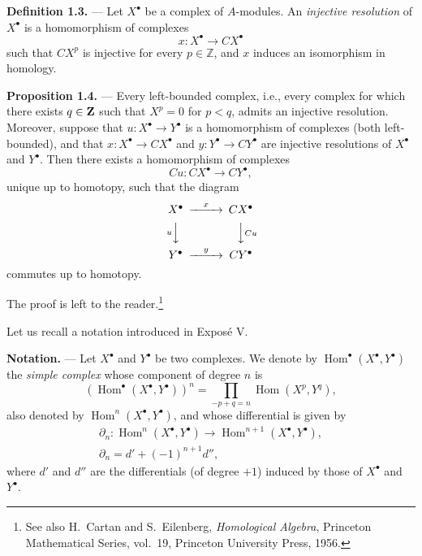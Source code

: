 \medskip
{}\noindent\textbf{Definition 1.3.} --- Let $X^\bullet$ be a complex of
$A$-modules. An \emph{injective resolution} of $X^\bullet$ is a homomorphism
of complexes
\[
  x\colon X^\bullet\longrightarrow CX^\bullet
\]
such that $CX^p$ is injective for every $p\in\mathbb Z$, and $x$ induces an
isomorphism in homology.


\noindent\textbf{Proposition 1.4.} --- Every left-bounded complex, i.e., every
complex for which there exists $q\in\mathbf Z$ such that $X^p=0$ for $p<q$, admits
an injective resolution. Moreover, suppose that
$u\colon X^\bullet\longrightarrow Y^\bullet$ is a homomorphism of complexes
(both left-bounded), and that
$x\colon X^\bullet\longrightarrow CX^\bullet$ and
$y\colon Y^\bullet\longrightarrow CY^\bullet$ are injective resolutions of
$X^\bullet$ and $Y^\bullet$. Then there exists a homomorphism of complexes
\[
  Cu\colon CX^\bullet\longrightarrow CY^\bullet,
\]
unique up to homotopy, such that the diagram
\[
\begin{CD}
X^\bullet @>{x}>> CX^\bullet \\
@V{u}VV @VV{Cu}V \\
Y^\bullet @>{y}>> CY^\bullet
\end{CD}
\]
commutes up to homotopy.


The proof is left to the reader.\footnote{See also H.~Cartan and
S.~Eilenberg, \emph{Homological Algebra}, Princeton Mathematical Series,
vol.~19, Princeton University Press, 1956.}

Let us recall a notation introduced in Expos\'e V.

\medskip
\noindent\textbf{Notation.} --- Let $X^\bullet$ and $Y^\bullet$ be two
complexes. We denote by $\operatorname{Hom}^\bullet(X^\bullet,Y^\bullet)$ the
\emph{simple complex} whose component of degree $n$ is
\[
  (\operatorname{Hom}^\bullet(X^\bullet,Y^\bullet))^n
  =\prod_{-p+q=n}\operatorname{Hom}(X^p,Y^q),
\]
also denoted by $\operatorname{Hom}^n(X^\bullet,Y^\bullet)$, and whose
differential is given by
\begin{gather*}
  \partial_n\colon
  \operatorname{Hom}^n(X^\bullet,Y^\bullet)
  \longrightarrow
  \operatorname{Hom}^{n+1}(X^\bullet,Y^\bullet),\\
  \partial_n=d'+(-1)^{n+1}d'',
\end{gather*}
where $d'$ and $d''$ are the differentials (of degree $+1$) induced by those
of $X^\bullet$ and $Y^\bullet$.


\renewcommand{\theequation}{1.\arabic{equation}}\setcounter{equation}{1}

